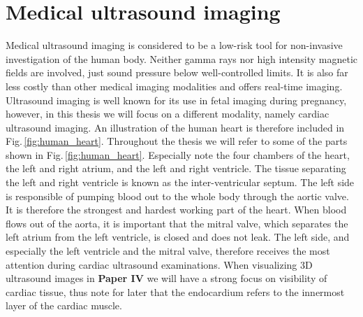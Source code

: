 \section {Medical ultrasound imaging}\label{sec:ultrasound}
Medical ultrasound imaging is considered to be a low-risk tool for non-invasive investigation of the human body. Neither gamma rays nor high intensity magnetic fields are involved, just sound pressure below well-controlled limits. It is also far less costly than other medical imaging modalities and offers real-time imaging. Ultrasound imaging is well known for its use in fetal imaging during pregnancy, however, in this thesis we will focus on a different modality, namely cardiac ultrasound imaging. An illustration of the human heart is therefore included in Fig.\,\ref{fig:human_heart}. Throughout the thesis we will refer to some of the parts shown in Fig.\,\ref{fig:human_heart}. Especially note the four chambers of the heart, the left and right atrium, and the left and right ventricle. The tissue separating the left and right ventricle is known as the inter-ventricular septum. The left side is responsible of pumping blood out to the whole body through the aortic valve. It is therefore the strongest and hardest working part of the heart. When blood flows out of the aorta, it is important that the mitral valve, which separates the left atrium from the left ventricle, is closed and does not leak. The left side, and especially the left ventricle and the mitral valve, therefore receives the most attention during cardiac ultrasound examinations. When visualizing 3D ultrasound images in \textbf{Paper IV} we will have a strong focus on visibility of cardiac tissue, thus note for later that the endocardium refers to the innermost layer of the cardiac muscle.

